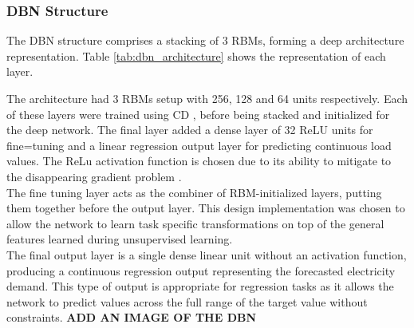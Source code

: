 \subsubsection{DBN Structure}
The DBN structure comprises a stacking of 3 RBMs, forming a deep architecture representation. Table \ref{tab:dbn_architecture} shows the representation of each layer.
\begin{table}[h]
	\centering
	
	
	\caption{DBN Layer configuration}
	\label{tab:dbn_architecture}
\end{table}

The architecture had 3 RBMs setup with 256, 128 and 64 units respectively. Each of these layers were trained using CD , before being stacked and initialized for the deep network. The final layer added a dense layer of 32 ReLU units for fine=tuning and a linear regression output layer for predicting continuous load values. The ReLu activation function is chosen due to its ability to mitigate to the disappearing gradient problem \cite{bibid}.\\
 The fine tuning layer acts as the combiner of RBM-initialized layers, putting them together before the output layer. This design implementation was chosen to allow the network to learn task specific transformations on top of the general features learned during unsupervised learning.\\ The final output layer is a single dense linear unit without an activation function, producing a continuous regression output representing the forecasted electricity demand. This type of output is appropriate for regression tasks as it allows the network to predict values across the full range of the target value without constraints.
\textbf{ADD AN IMAGE OF THE DBN}

